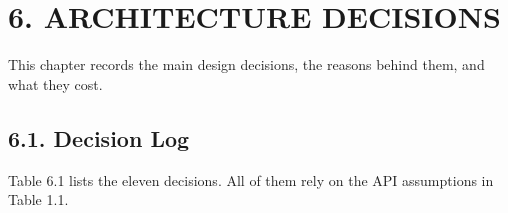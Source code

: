 \section*{6. ARCHITECTURE DECISIONS}

{}

This chapter records the main design decisions, the reasons behind them, and what they cost.

\subsection*{6.1. Decision Log}

{}


Table 6.1 lists the eleven decisions. All of them rely on the API assumptions in Table 1.1.

